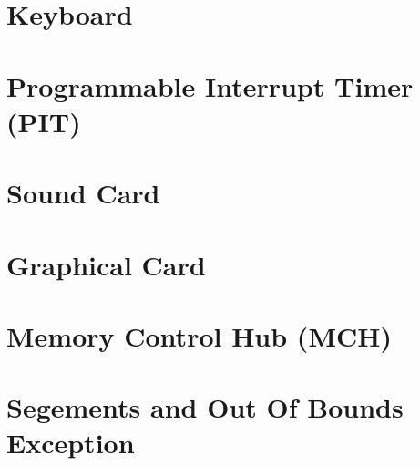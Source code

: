 \documentclass[oneside, a4paper]{memoir}
\begin{document}
\section{Keyboard}
\section{Programmable Interrupt Timer (PIT)}
\section{Sound Card}
\section{Graphical Card}
\section{Memory Control Hub (MCH)}
\section{Segements and Out Of Bounds Exception}
\end{document}
